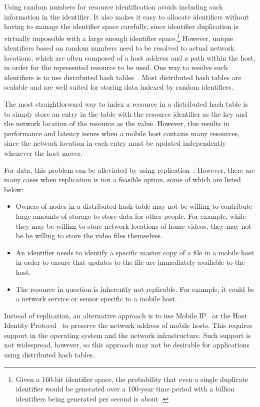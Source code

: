 \documentclass{article}
\begin{document}
Using random numbers for resource identification avoids including such
information in the identifier.  It also makes it easy to allocate
identifiers without having to manage the identifier space carefully,
since identifier duplication is virtually impossible with a large
enough identifier space.\footnote{Given a 160-bit identifier space,
  the probability that even a single duplicate identifier would be
  generated over a 100-year time period with a billion identifiers
  being generated per second is about .}  However, unique
identifiers based on random numbers need to be resolved to actual
network locations, which are often composed of a host address and a
path within the host, in order for the represented resource to be
used.  One way to resolve such identifiers is to use distributed hash
tables~\cite{androutsellis:survey2004,stoica:ton2003}.  Most
distributed hash tables are scalable and are well suited for storing
data indexed by random identifiers.

The most straightforward way to index a resource in a distributed hash
table is to simply store an entry in the table with the resource
identifier as the key and the network location of the resource as the
value.  However, this results in performance and latency issues when a
mobile host contains many resources, since the network location in
each entry must be updated independently whenever the host moves.

For data, this problem can be alleviated by using
replication~\cite{cfs,past}.  However, there are many cases when
replication is not a feasible option, some of which are listed below:

\begin{itemize}
\item Owners of nodes in a distributed hash table may not be willing
  to contribute large amounts of storage to store data for other
  people.  For example, while they may be willing to store network
  locations of home videos, they may not be be willing to store the
  video files themselves.
\item An identifier needs to identify a specific master copy of a file
  in a mobile host in order to ensure that updates to the file are
  immediately available to the host.
\item The resource in question is inherently not replicable.  For
  example, it could be a network service or sensor specific to a
  mobile host.
\end{itemize}

Instead of replication, an alternative approach is to use Mobile
IP~\cite{mobileip} or the Host Identity Protocol~\cite{rfc4423} to
preserve the network address of mobile hosts.  This requires support
in the operating system and the network infrastructure.  Such support
is not wide\-spread, however, so this approach may not be desirable
for applications using distributed hash tables.
\end{document}
